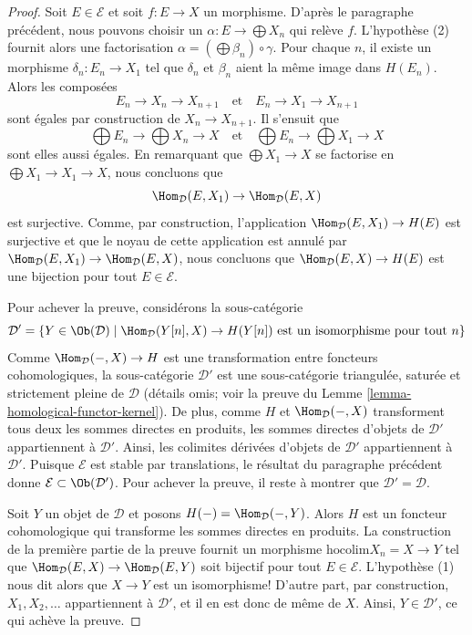 \begin{proof}
\medskip\noindent
Soit $E \in \mathcal{E}$ et soit $f : E \to X$ un morphisme.
D'après le paragraphe précédent, nous pouvons choisir un
$\alpha : E \to \bigoplus X_n$ qui relève $f$. L'hypothèse (2) fournit alors
une factorisation $\alpha = (\bigoplus \beta_n) \circ \gamma$.
Pour chaque $n$, il existe un morphisme $\delta_n : E_n \to X_1$ tel que
$\delta_n$ et $\beta_n$ aient la même image dans $H(E_n)$. Alors les composées
$$
E_n \to X_n \to X_{n + 1}
\quad\text{et}\quad
E_n \to X_1 \to X_{n + 1}
$$
sont égales par construction de $X_n \to X_{n + 1}$. Il s'ensuit que
$$
\bigoplus E_n \to \bigoplus X_n \to X
\quad\text{et}\quad
\bigoplus E_n \to \bigoplus X_1 \to X
$$
sont elles aussi égales. En remarquant que $\bigoplus X_1 \to X$ se factorise
en $\bigoplus X_1 \to X_1 \to X$, nous concluons que
$$
\Hom_\mathcal{D}(E, X_1) \to \Hom_\mathcal{D}(E, X)
$$
est surjective. Comme, par construction, l'application
$\Hom_\mathcal{D}(E, X_1) \to H(E)$ est surjective et que le noyau de cette
application est annulé par
$\Hom_\mathcal{D}(E, X_1) \to \Hom_\mathcal{D}(E, X)$, nous concluons que
$\Hom_\mathcal{D}(E, X) \to H(E)$ est une bijection pour tout
$E \in \mathcal{E}$.

\medskip\noindent
Pour achever la preuve, considérons la sous-catégorie
$$
\mathcal{D}' =
\{Y \in \Ob(\mathcal{D}) \mid \Hom_\mathcal{D}(Y[n], X) \to H(Y[n])
\text{ est un isomorphisme pour tout }n\}
$$
Comme $\Hom_\mathcal{D}(-, X) \to H$ est une transformation entre foncteurs
cohomologiques, la sous-catégorie $\mathcal{D}'$ est une sous-catégorie
triangulée, saturée et strictement pleine de $\mathcal{D}$ (détails omis;
voir la preuve du Lemme \ref{lemma-homological-functor-kernel}).
De plus, comme $H$ et $\Hom_\mathcal{D}(-, X)$ transforment tous deux les
sommes directes en produits, les sommes directes d'objets de $\mathcal{D}'$
appartiennent à $\mathcal{D}'$. Ainsi, les colimites dérivées d'objets de
$\mathcal{D}'$ appartiennent à $\mathcal{D}'$.
Puisque $\mathcal{E}$ est stable par translations, le résultat du paragraphe
précédent donne $\mathcal{E} \subset \Ob(\mathcal{D}')$.
Pour achever la preuve, il reste à montrer que
$\mathcal{D}' = \mathcal{D}$.

\medskip\noindent
Soit $Y$ un objet de $\mathcal{D}$ et posons
$H(-) = \Hom_\mathcal{D}(-, Y)$. Alors $H$ est un foncteur cohomologique qui
transforme les sommes directes en produits.
La construction de la première partie de la preuve fournit un morphisme
$\text{hocolim} X_n = X \to Y$ tel que
$\Hom_\mathcal{D}(E, X) \to \Hom_\mathcal{D}(E, Y)$ soit bijectif pour tout
$E \in \mathcal{E}$. L'hypothèse (1) nous dit alors que $X \to Y$ est un
isomorphisme! D'autre part, par construction, $X_1, X_2, \ldots$ appartiennent
à $\mathcal{D}'$, et il en est donc de même de $X$. Ainsi,
$Y \in \mathcal{D}'$, ce qui achève la preuve.
\end{proof}

